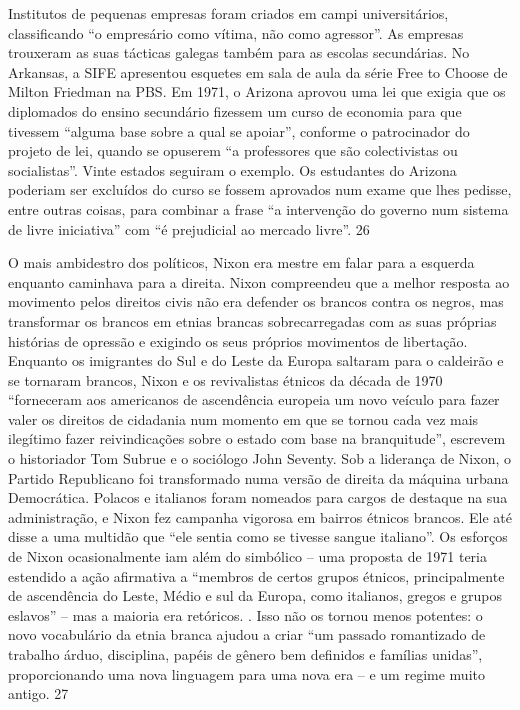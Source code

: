  
\par
 
Institutos de pequenas empresas foram criados em campi universitários, classificando “o empresário como vítima, não como agressor”. As empresas trouxeram as suas tácticas galegas também para as escolas secundárias. No Arkansas, a SIFE apresentou esquetes em sala de aula da série Free to Choose de Milton Friedman na PBS. Em 1971, o Arizona aprovou uma lei que exigia que os diplomados do ensino secundário fizessem um curso de economia para que tivessem “alguma base sobre a qual se apoiar”, conforme o patrocinador do projeto de lei, quando se opuserem “a professores que são colectivistas ou socialistas”. Vinte estados seguiram o exemplo. Os estudantes do Arizona poderiam ser excluídos do curso se fossem aprovados num exame que lhes pedisse, entre outras coisas, para combinar a frase “a intervenção do governo num sistema de livre iniciativa” com “é prejudicial ao mercado livre”.
 {\color{blue} 26}  

 
\par
 
O mais ambidestro dos políticos, Nixon era mestre em falar para a esquerda enquanto caminhava para a direita. Nixon compreendeu que a melhor resposta ao movimento pelos direitos civis não era defender os brancos contra os negros, mas transformar os brancos em etnias brancas sobrecarregadas com as suas próprias histórias de opressão e exigindo os seus próprios movimentos de libertação. Enquanto os imigrantes do Sul e do Leste da Europa saltaram para o caldeirão e se tornaram brancos, Nixon e os revivalistas étnicos da década de 1970 “forneceram aos americanos de ascendência europeia um novo veículo para fazer valer os direitos de cidadania num momento em que se tornou cada vez mais ilegítimo fazer reivindicações sobre o estado com base na branquitude”, escrevem o historiador Tom Subrue e o sociólogo John Seventy. Sob a liderança de Nixon, o Partido Republicano foi transformado numa versão de direita da máquina urbana Democrática. Polacos e italianos foram nomeados para cargos de destaque na sua administração, e Nixon fez campanha vigorosa em bairros étnicos brancos. Ele até disse a uma multidão que “ele sentia como se tivesse sangue italiano”. Os esforços de Nixon ocasionalmente iam além do simbólico – uma proposta de 1971 teria estendido a ação afirmativa a “membros de certos grupos étnicos, principalmente de ascendência do Leste, Médio e sul da Europa, como italianos, gregos e grupos eslavos” – mas a maioria era retóricos. . Isso não os tornou menos potentes: o novo vocabulário da etnia branca ajudou a criar “um passado romantizado de trabalho árduo, disciplina, papéis de gênero bem definidos e famílias unidas”, proporcionando uma nova linguagem para uma nova era – e um regime muito antigo.
 {\color{blue} 27}  

